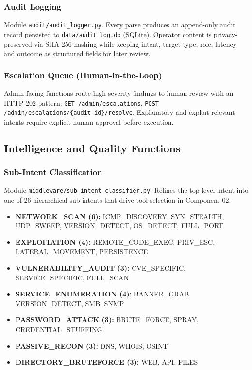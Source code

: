 \documentclass[10pt,journal,onecolumn]{IEEEtran}
\begin{document}
\subsubsection{Audit Logging}

Module \texttt{audit/audit\_logger.py}. Every parse produces an append-only audit record persisted to \texttt{data/audit\_log.db} (SQLite). Operator content is privacy-preserved via SHA-256 hashing while keeping intent, target type, role, latency and outcome as structured fields for later review.

\subsubsection{Escalation Queue (Human-in-the-Loop)}

Admin-facing functions route high-severity findings to human review with an HTTP 202 pattern: \texttt{GET /admin/escalations}, \texttt{POST /\allowbreak admin/\allowbreak escalations/\allowbreak \{audit\_\allowbreak id\}/\allowbreak resolve}. Explanatory and exploit-relevant intents require explicit human approval before execution.

\subsection{Intelligence and Quality Functions}

\subsubsection{Sub-Intent Classification}

Module \texttt{middleware/\allowbreak sub\_\allowbreak intent\_\allowbreak classifier.\allowbreak py}. Refines the top-level intent into one of 26 hierarchical sub-intents that drive tool selection in Component 02:

\begin{itemize}
\item \textbf{NETWORK\_SCAN (6):} ICMP\_DISCOVERY, SYN\_STEALTH, UDP\_SWEEP, VERSION\_DETECT, OS\_DETECT, FULL\_PORT
\item \textbf{EXPLOITATION (4):} REMOTE\_CODE\_EXEC, PRIV\_ESC, LATERAL\_MOVEMENT, PERSISTENCE
\item \textbf{VULNERABILITY\_AUDIT (3):} CVE\_SPECIFIC, SERVICE\_SPECIFIC, FULL\_SCAN
\item \textbf{SERVICE\_ENUMERATION (4):} BANNER\_GRAB, VERSION\_DETECT, SMB, SNMP
\item \textbf{PASSWORD\_ATTACK (3):} BRUTE\_FORCE, SPRAY, CREDENTIAL\_STUFFING
\item \textbf{PASSIVE\_RECON (3):} DNS, WHOIS, OSINT
\item \textbf{DIRECTORY\_BRUTEFORCE (3):} WEB, API, FILES
\end{itemize}
\end{document}
